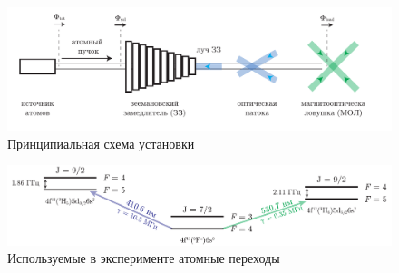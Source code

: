\begin{figure}[h]
    \centering
    \includegraphics[width=1.0\textwidth]{../MOT/figs/sheme.pdf}
    \caption{Принципиальная схема установки}
\end{figure}


\begin{figure}[h]
    \centering
    \includegraphics[width=1.0\textwidth]{../MOT/figs/tm_pres.pdf}
    \caption{Используемые в эксперименте атомные переходы}
\end{figure}


